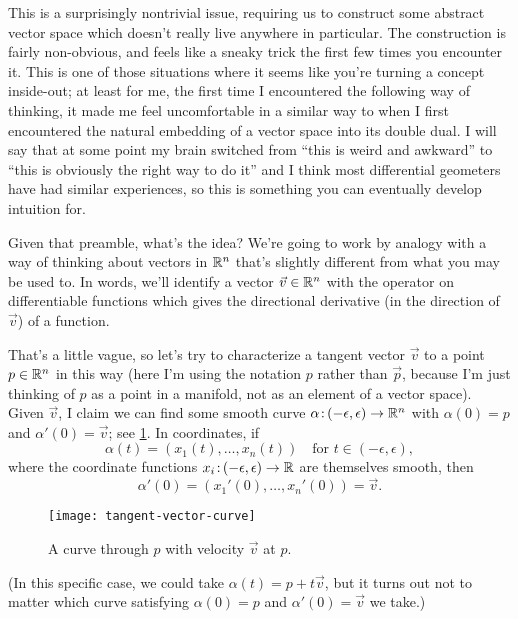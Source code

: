This is a surprisingly nontrivial issue, requiring us to construct some abstract vector space which doesn't really live anywhere in particular. The construction is fairly non-obvious, and feels like a sneaky trick the first few times you encounter it. This is one of those situations where it seems like you're turning a concept inside-out; at least for me, the first time I encountered the following way of thinking, it made me feel uncomfortable in a similar way to when I first encountered the natural embedding of a vector space into its double dual. I will say that at some point my brain switched from ``this is weird and awkward'' to ``this is obviously the right way to do it'' and I think most differential geometers have had similar experiences, so this is something you can eventually develop intuition for.


Given that preamble, what's the idea? We're going to work by analogy with a way of thinking about vectors in $\mathbb{R}^n$ that's slightly different from what you may be used to. In words, we'll identify a vector $\vec{v} \in \mathbb{R}^n$ with the operator on differentiable functions which gives the directional derivative (in the direction of $\vec{v}$) of a function. 

That's a little vague, so let's try to characterize a tangent vector $\vec{v}$ to a point $p \in \mathbb{R}^n$ in this way (here I'm using the notation $p$ rather than $\vec{p}$, because I'm just thinking of $p$ as a point in a manifold, not as an element of a vector space). Given $\vec{v}$, I claim we can find some smooth curve $\alpha\colon\thinspace\!\! (-\epsilon, \epsilon) \to \mathbb{R}^n$ with $\alpha(0) = p$ and $\alpha'(0) = \vec{v}$; see \cref{fig:tangent vector curve}. In coordinates, if
\[
	\alpha(t) = (x_1(t), \dots , x_n(t)) \quad \text{for } t \in (-\epsilon, \epsilon),
\]
where the coordinate functions $x_i\colon\thinspace\!\! (-\epsilon,\epsilon) \to \mathbb{R}$ are themselves smooth, then
\[
	\alpha'(0) = (x_1'(0), \dots , x_n'(0)) = \vec{v}.
\]

\begin{figure}[htbp]
	\centering
		\texttt{[image: tangent-vector-curve]}
	\caption{A curve through $p$ with velocity $\vec{v}$ at $p$.}
	\label{fig:tangent vector curve}
\end{figure}

(In this specific case, we could take $\alpha(t) = p + t\vec{v}$, but it turns out not to matter which curve satisfying $\alpha(0) = p$ and $\alpha'(0) = \vec{v}$ we take.)

